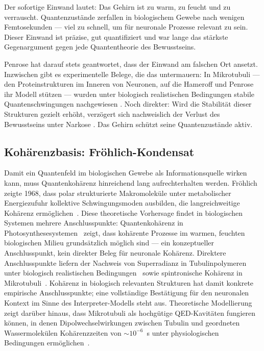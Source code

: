 \documentclass[11pt,a4paper]{article}
\begin{document}
Der sofortige Einwand lautet: Das Gehirn ist zu warm, zu feucht und zu verrauscht.
Quantenzustände zerfallen in biologischem Gewebe nach wenigen Femtosekunden — viel
zu schnell, um für neuronale Prozesse relevant zu sein. Dieser Einwand ist präzise,
gut quantifiziert und war lange das stärkste Gegenargument gegen jede Quantentheorie
des Bewusstseins.

Penrose hat darauf stets geantwortet, dass der Einwand am falschen Ort ansetzt.
Inzwischen gibt es experimentelle Belege, die das untermauern: In Mikrotubuli — den
Proteinstrukturen im Inneren von Neuronen, auf die Hameroff und Penrose ihr Modell
stützen \citep{hameroff2014} — wurden unter biologisch realistischen Bedingungen
stabile Quantenschwingungen nachgewiesen \citep{tuszynski2024,wiest2025spintronic}.
Noch direkter: Wird die Stabilität dieser Strukturen gezielt erhöht, verzögert sich
nachweislich der Verlust des Bewusstseins unter Narkose \citep{wiest2025substrate}.
Das Gehirn schützt seine Quantenzustände aktiv.

\subsection*{Kohärenzbasis: Fröhlich-Kondensat}

Damit ein Quantenfeld im biologischen Gewebe als Informationsquelle wirken kann,
muss Quantenkohärenz hinreichend lang aufrechterhalten werden. Fröhlich zeigte 1968,
dass polar strukturierte Makromoleküle unter metabolischer Energiezufuhr kollektive
Schwingungsmoden ausbilden, die langreichweitige Kohärenz ermöglichen~\citep{frohlich1968}.
Diese theoretische Vorhersage findet in biologischen Systemen mehrere Anschlusspunkte:
Quantenkohärenz in Photosynthesesystemen~\citep{engel2007} zeigt, dass kohärente
Prozesse im warmen, feuchten biologischen Milieu grundsätzlich möglich sind —
ein konzeptueller Anschlusspunkt, kein direkter Beleg für neuronale Kohärenz.
Direktere Anschlusspunkte liefern der Nachweis von Superradianz in Tubulinpolymeren
unter biologisch realistischen Bedingungen~\citep{tuszynski2024} sowie spintronische
Kohärenz in Mikrotubuli~\citep{wiest2025spintronic}. Kohärenz in biologisch relevanten
Strukturen hat damit konkrete empirische Anschlusspunkte; eine vollständige Bestätigung
für den neuronalen Kontext im Sinne des Interpreter-Modells steht aus. Theoretische Modellierung
zeigt darüber hinaus, dass Mikrotubuli als hochgütige QED-Kavitäten fungieren können,
in denen Dipolwechselwirkungen zwischen Tubulin und geordneten Wassermolekülen
Kohärenzzeiten von $\sim\!10^{-6}$~s unter physiologischen Bedingungen ermöglichen~\citep{mavromatos2025}.
\end{document}
